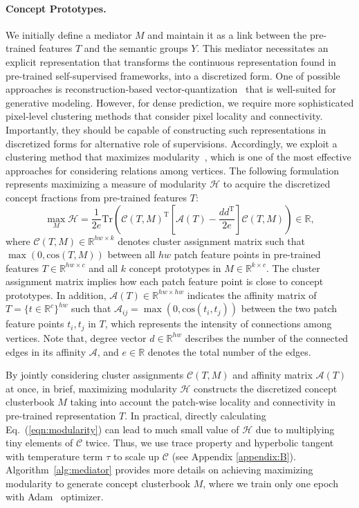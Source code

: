 \documentclass{article} \usepackage{iclr2024_conference,times}
\begin{document}
\paragraph{Concept Prototypes.} We initially define a mediator $M$ and maintain it as a link between the pre-trained features $T$ and the semantic groups $Y$. This mediator necessitates an explicit representation that transforms the continuous representation found in pre-trained self-supervised frameworks, into a discretized form. One of possible approaches is reconstruction-based vector-quantization~\citep{van2017neural, esser2021taming} that is well-suited for generative modeling. However, for dense prediction, we require more sophisticated pixel-level clustering methods that consider pixel locality and connectivity. Importantly, they should be capable of constructing such representations in discretized forms for alternative role of supervisions. Accordingly, we exploit a clustering method that maximizes modularity~\citep{newman2006modularity}, which is one of the most effective approaches for considering relations among vertices. The following formulation represents maximizing a measure of modularity $\mathcal{H}$ to acquire the discretized concept fractions from pre-trained features $T$:
\begin{equation}
    \max_{M}\mathcal{H} = \frac{1}{2e}\text{Tr}\left(\mathcal{C}(T, M)^{\text{T}}\left[\mathcal{A}(T)-\frac{dd^{\text{T}}}{2e}\right]\mathcal{C}(T, M)\right)\in\mathbb{R},
\label{eqn:modularity}
\end{equation}
where $\mathcal{C}(T, M)\in\mathbb{R}^{hw\times k}$ denotes cluster assignment matrix such that $\max(0, \text{cos}(T, M))$ between all $hw$ patch feature points in pre-trained features $T\in\mathbb{R}^{hw \times c}$ and all $k$ concept prototypes in $M\in\mathbb{R}^{k\times c}$. The cluster assignment matrix implies how each patch feature point is close to concept prototypes. In addition, $\mathcal{A}(T)\in\mathbb{R}^{hw\times hw}$ indicates the affinity matrix of $T=\{t\in\mathbb{R}^{c}\}^{hw}$ such that $\mathcal{A}_{ij}=\max(0, \text{cos}(t_i, t_j))$ between the two patch feature points $t_i, t_j$ in $T$, which represents the intensity of connections among vertices. Note that, degree vector $d\in\mathbb{R}^{hw}$ describes the number of the connected edges in its affinity $\mathcal{A}$, and $e\in\mathbb{R}$ denotes the total number of the edges. 

By jointly considering cluster assignments $\mathcal{C}(T,M)$ and affinity matrix $\mathcal{A}(T)$ at once, in brief, maximizing modularity $\mathcal{H}$ constructs the discretized concept clusterbook $M$ taking into account the patch-wise locality and connectivity in pre-trained representation $T$. In practical, directly calculating Eq.~(\ref{eqn:modularity}) can lead to much small value of $\mathcal{H}$ due to multiplying tiny elements of $\mathcal{C}$ twice. Thus, we use trace property and hyperbolic tangent with temperature term $\tau$ to scale up $\mathcal{C}$ (see Appendix \ref{appendix:B}). Algorithm~\ref{alg:mediator} provides more details on achieving maximizing modularity to generate concept clusterbook $M$, where we train only one epoch with Adam~\citep{kingma2014adam} optimizer.
\end{document}
